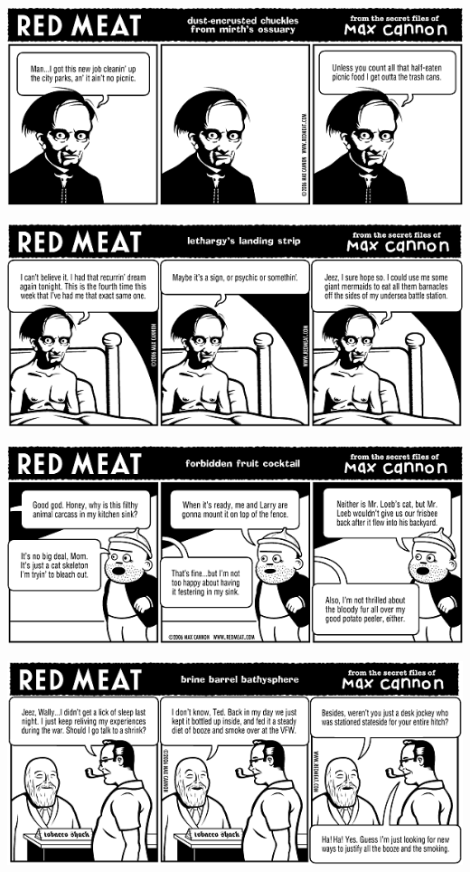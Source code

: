 \documentclass[a4paper,twoside,11pt]{article}
\begin{document}
\includegraphics[width=\textwidth]{redmeat_2006-08-29.png}



\includegraphics[width=\textwidth]{redmeat_2006-09-05.png}



\includegraphics[width=\textwidth]{redmeat_2006-09-12.png}



\includegraphics[width=\textwidth]{redmeat_2006-09-19.png}
\end{document}
